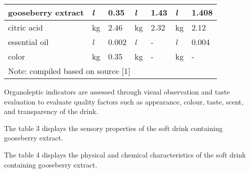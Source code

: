 \begin{table}[H]
\begin{tabular}{|lllllll|}
  \multicolumn{1}{|l|}{gooseberry extract}            & \multicolumn{1}{l|}{\textit{l}}     & \multicolumn{1}{l|}{0.35}     & \multicolumn{1}{l|}{\textit{l}}     & \multicolumn{1}{l|}{1.43}     & \multicolumn{1}{l|}{\textit{l}}     & 1.408    \\ \hline
  \multicolumn{1}{|l|}{citric acid}                   & \multicolumn{1}{l|}{kg}             & \multicolumn{1}{l|}{2.46}     & \multicolumn{1}{l|}{kg}             & \multicolumn{1}{l|}{2.32}     & \multicolumn{1}{l|}{kg}             & 2.12     \\ \hline
  \multicolumn{1}{|l|}{essential oil}                 & \multicolumn{1}{l|}{\textit{l}}     & \multicolumn{1}{l|}{0.002}    & \multicolumn{1}{l|}{\textit{l}}     & \multicolumn{1}{l|}{-}        & \multicolumn{1}{l|}{\textit{l}}     & 0.004    \\ \hline
  \multicolumn{1}{|l|}{color}                         & \multicolumn{1}{l|}{kg}             & \multicolumn{1}{l|}{0.35}     & \multicolumn{1}{l|}{kg}             & \multicolumn{1}{l|}{-}        & \multicolumn{1}{l|}{kg}             & -        \\ \hline
  \multicolumn{7}{|l|}{Note: compiled based on source {[}1{]}}                                                                                                                                                                                     \\ \hline
  \end{tabular}
  \end{table}

\begin{multicols}{2}

Organoleptic indicators are assessed through visual observation and
taste evaluation to evaluate quality factors such as appearance, colour,
taste, scent, and transparency of the drink.~

The table 3 displays the sensory properties of the soft drink containing
gooseberry extract.~

The table 4 displays the physical and chemical characteristics of the
soft drink containing gooseberry extract.
\end{multicols}


